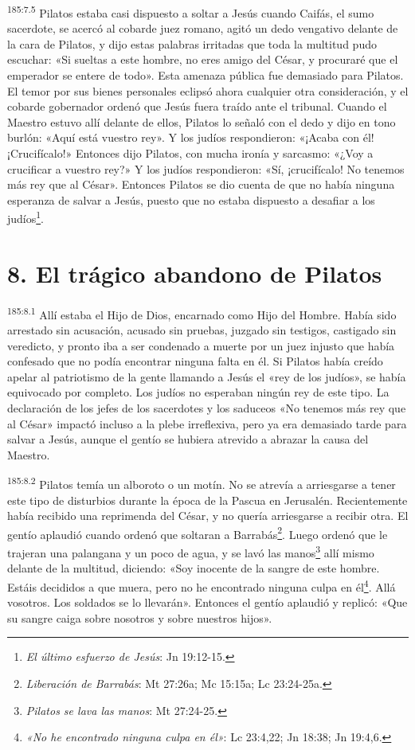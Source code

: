 \par
\textsuperscript{185:7.5} Pilatos estaba casi dispuesto a soltar a Jesús cuando Caifás, el sumo sacerdote, se acercó al cobarde juez romano, agitó un dedo vengativo delante de la cara de Pilatos, y dijo estas palabras irritadas que toda la multitud pudo escuchar: «Si sueltas a este hombre, no eres amigo del César, y procuraré que el emperador se entere de todo». Esta amenaza pública fue demasiado para Pilatos. El temor por sus bienes personales eclipsó ahora cualquier otra consideración, y el cobarde gobernador ordenó que Jesús fuera traído ante el tribunal. Cuando el Maestro estuvo allí delante de ellos, Pilatos lo señaló con el dedo y dijo en tono burlón: «Aquí está vuestro rey». Y los judíos respondieron: «¡Acaba con él! ¡Crucifícalo!» Entonces dijo Pilatos, con mucha ironía y sarcasmo: «¿Voy a crucificar a vuestro rey?» Y los judíos respondieron: «Sí, ¡crucifícalo! No tenemos más rey que al César». Entonces Pilatos se dio cuenta de que no había ninguna esperanza de salvar a Jesús, puesto que no estaba dispuesto a desafiar a los judíos\footnote{\textit{El último esfuerzo de Jesús}: Jn 19:12-15.}.

\section*{8. El trágico abandono de Pilatos}
\par
\textsuperscript{185:8.1} Allí estaba el Hijo de Dios, encarnado como Hijo del Hombre. Había sido arrestado sin acusación, acusado sin pruebas, juzgado sin testigos, castigado sin veredicto, y pronto iba a ser condenado a muerte por un juez injusto que había confesado que no podía encontrar ninguna falta en él. Si Pilatos había creído apelar al patriotismo de la gente llamando a Jesús el «rey de los judíos», se había equivocado por completo. Los judíos no esperaban ningún rey de este tipo. La declaración de los jefes de los sacerdotes y los saduceos «No tenemos más rey que al César» impactó incluso a la plebe irreflexiva, pero ya era demasiado tarde para salvar a Jesús, aunque el gentío se hubiera atrevido a abrazar la causa del Maestro.

\par
\textsuperscript{185:8.2} Pilatos temía un alboroto o un motín. No se atrevía a arriesgarse a tener este tipo de disturbios durante la época de la Pascua en Jerusalén. Recientemente había recibido una reprimenda del César, y no quería arriesgarse a recibir otra. El gentío aplaudió cuando ordenó que soltaran a Barrabás\footnote{\textit{Liberación de Barrabás}: Mt 27:26a; Mc 15:15a; Lc 23:24-25a.}. Luego ordenó que le trajeran una palangana y un poco de agua, y se lavó las manos\footnote{\textit{Pilatos se lava las manos}: Mt 27:24-25.} allí mismo delante de la multitud, diciendo: «Soy inocente de la sangre de este hombre. Estáis decididos a que muera, pero no he encontrado ninguna culpa en él\footnote{\textit{«No he encontrado ninguna culpa en él»}: Lc 23:4,22; Jn 18:38; Jn 19:4,6.}. Allá vosotros. Los soldados se lo llevarán». Entonces el gentío aplaudió y replicó: «Que su sangre caiga sobre nosotros y sobre nuestros hijos».